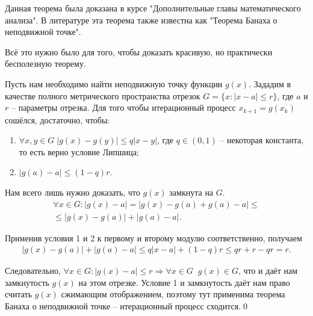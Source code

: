 \documentclass[../main.tex]{subfile}
\begin{document}
Данная теорема была доказана в курсе "Дополнительные главы математического анализа"{}.
В литературе эта теорема также известна как "Теорема Банаха о неподвижной точке"{}.

Всё это нужно было для того, чтобы доказать красивую, но практически бесполезную
теорему.

\begin{theorem}
	Пусть нам необходимо найти неподвижную точку функции $g(x)$. Зададим
	в качестве полного метрического пространства отрезок $G=\{x: |x-a| \le r\}$,
	где $a$ и $r$ -- параметры отрезка. Для того чтобы итерационный процесс
	$x_{k+1}=g(x_k)$ сошёлся, достаточно, чтобы:
	\begin{enumerate}
		\item $\forall x,y\in G\;|g(x)-g(y)|\le q|x-y|$, где $q\in(0,1)$ --
			некоторая константа, то есть верно условие Липшица;
		\item $|g(a)-a|\le(1-q)r$.
	\end{enumerate}
\end{theorem}

\beginproof

	Нам всего лишь нужно доказать, что $g(x)$ замкнута на $G$.
	\begin{multline*}
		\forall x\in G:|g(x)-a|=|g(x)-g(a)+g(a)-a|\le \\
		\le|g(x)-g(a)|+|g(a)-a|.
	\end{multline*}

	Применив условия 1 и 2 к первому и второму модулю соответственно, получаем
	\begin{align*}
		|g(x)-g(a)|+|g(a)-a|\le q|x-a|+(1-q)r\le qr+r-qr=r.
	\end{align*}

	Следовательно, $\forall x\in G: |g(x)-a|\le r\Rightarrow\forall x\in G\;\;g(x)\in G$,
	что и даёт нам замкнутость $g(x)$ на этом отрезке. Условие 1 и замкнутость
	даёт нам право считать $g(x)$ сжимающим отображением, поэтому тут применима
	теорема Банаха о неподвижной точке -- итерационный процесс сходится.\qed
\end{document}
